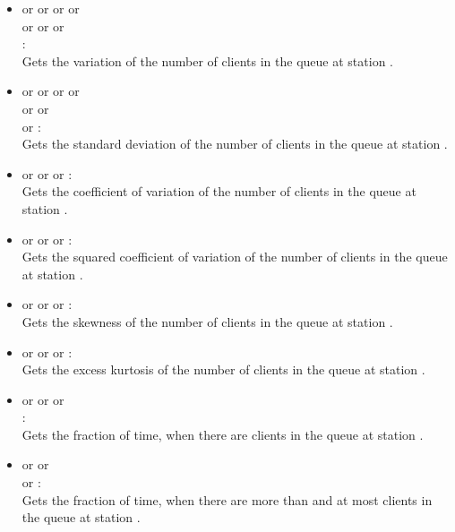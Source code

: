 \begin{itemize}
\item
{} or  or  or  or\\
 or  or  or\\
:\\
Gets the variation of the number of clients in the queue at station .

\item
{} or  or  or  or\\
 or  or\\
 or :\\
Gets the standard deviation of the number of clients in the queue at station .

\item
{} or  or  or :\\
Gets the coefficient of variation of the number of clients in the queue at station .

\item
{} or  or  or :\\
Gets the squared coefficient of variation of the number of clients in the queue at station .

\item
{} or  or  or :\\
Gets the skewness of the number of clients in the queue at station .

\item
{} or  or  or :\\
Gets the excess kurtosis of the number of clients in the queue at station .

\item
{} or  or  or\\ :\\
Gets the fraction of time, when there are  clients in the queue at station .

\item
{} or  or\\  or :\\
Gets the fraction of time, when there are more than  and at most  clients in the queue at station .

\end{itemize}



